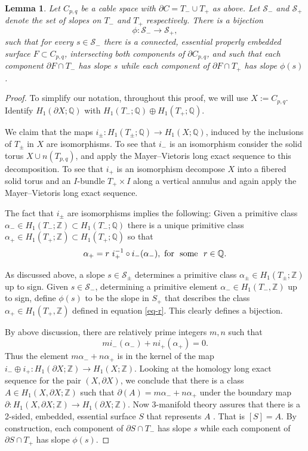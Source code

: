 \documentclass[11pt]{amsart}
\newtheorem{lemma}[theorem]{Lemma}
\theoremstyle{definition}
\newcommand{\ZZ}{{\mathbb{Z}}}
\newcommand{\QQ}{{\mathbb{Q}}}
\newcommand{\C}{{C_{p, q}}}
\begin{document}
\begin{lemma} \label{bijection} Let $\C$ be a cable space with $\partial C= T_{-}\cup T_{+}$ as above. 
Let $\mathcal {S}_{-}$ and $\mathcal{S}_{+}$ denote the set of slopes on $T_{-}$ and $T_{+}$ respectively.
There is  a bijection
$$\phi: \mathcal {S}_{-}\longrightarrow \mathcal {S}_{+},$$
such that for every $s\in \mathcal {S}_{-}$
there is a connected, essential  properly embedded surface $F\subset \C$, intersecting both components of $\partial \C$,
and such that each component $\partial F\cap T_{-}$ has slope $s$ while each component of $\partial F\cap T_{+}$ has slope $\phi(s)$.

\end{lemma}
\begin{proof}To simplify our notation, throughout this proof, we will use $X:=\C$.
Identify $H_1(\partial X ; \QQ)$  with $H_1(T_{-};  \QQ)\oplus H_1(T_{+};  \QQ)$. 

We claim that the maps 
$i_{\pm}  : H_1(T_{\pm};  \QQ) \longrightarrow H_1(X; \QQ)$, induced by the inclusions of $T_{\pm}$ in $X$ are isomorphisms.
To see that $i_{-}$ is an isomorphism consider the solid torus $X\cup n(T_{p,q})$, and apply the
Mayer--Vietoris long exact sequence to this decomposition. To see that $i_{+}$ is an isomorphism decompose $X$ into a fibered solid torus and an $I$-bundle
$T_{+}\times I$ along a vertical annulus and again apply the Mayer--Vietoris long exact sequence.

The fact that $i_{\pm}$ are isomorphisms implies  the following: Given a primitive class $\alpha_{-} \in H_1(T_{-};  \ZZ) \subset H_1(T_{-}; \QQ)$
there is a unique primitive class $\alpha_{+} \in H_1(T_{+};  \ZZ) \subset H_1(T_{+}; \QQ)$
so that
\begin{equation}
\label{eq-r}
\alpha_{+} = r \ i_{+}^{-1}\circ i_{-}(\alpha_{-}), \  {\text {\rm for \ some }} \   r\in \QQ.
\end{equation}

As discussed above, a  slope $s\in \mathcal {S}_{\pm}$  determines  a primitive class $\alpha_{\pm} \in H_1(T_{\pm};  \ZZ)$ 
up to sign. 
Given  $s\in \mathcal {S}_{-}$, determining a primitive element $\alpha_{-} \in H_1(T_{-},  \ZZ)$  up to sign, 
define $\phi(s)$ to be the slope  in $S_{+}$ that describes the class $\alpha_{+} \in  H_1(T_{+},  \ZZ)$ defined in equation \eqref{eq-r}.
This clearly defines a bijection.

By above discussion, there are relatively prime integers $m,n $  such that 
$$m i_{-}(\alpha_{-})+ n i_{+}(\alpha_{+})=0.$$ Thus the element
$m\alpha_{-} + n\alpha_{+}$ is in the kernel of the map
$i_{-}\oplus i_{+}: H_1(\partial X;  \ZZ) \longrightarrow H_1( X; \ZZ) $. Looking at the homology  long exact sequence for the pair $(X, \partial X)$,
we conclude that there is a class $A \in H_1(X, \partial X; \ZZ)$ such that
$\partial (A)=m\alpha_{-} + n\alpha_{+}$ under the boundary map
$\partial: H_1(X, \partial X; \ZZ) \longrightarrow H_1(\partial X; \ZZ)$.
Now 3-manifold theory assures that there is a 2-sided, embedded, essential  surface $S$ that represents $A$ \cite[Lemma 6.6]{hempel}.
That is $[S]=A$.
By construction, each component of $\partial S\cap T_{-}$ has slope $s$ while each component of $\partial S\cap T_{+}$ has slope $\phi(s)$.


\end{proof}
\end{document}
